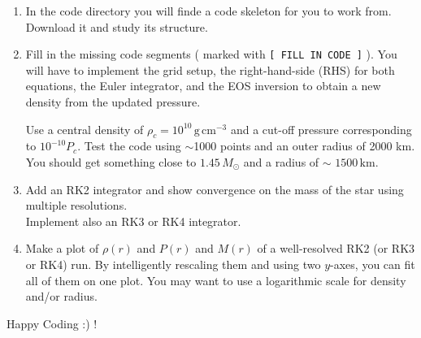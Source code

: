 \documentclass[11pt]{article}
\begin{document}


\begin{enumerate}
\item In the code directory  you will finde a code skeleton for you to work
  from. Download it and study its structure.

\item Fill in the missing code segments (
  marked with  {\tt [ FILL IN CODE ]} ). You will have to implement
  the grid setup, the right-hand-side (RHS) for both equations,
  the Euler integrator, and the EOS inversion to obtain a new density
  from the updated pressure.

  Use a central density of $\rho_c = 10^{10}\,
  \mathrm{g}\,\mathrm{cm}^{-3}$ and a cut-off pressure corresponding
  to  $10^{-10} P_c$.  Test the code using 
  $\sim$1000 points and an outer radius of 2000 km.  You should get
  something close to $1.45\,M_\odot$ and a radius of
  $\sim$ $1500\,\mathrm{km}$.

\item Add an RK2 integrator and show convergence on
  the mass of the star using multiple resolutions. \\

  Implement also an RK3 or RK4 integrator.

\item

  Make a plot of $\rho(r)$ and $P(r)$ and $M(r)$ of a well-resolved
  RK2 (or RK3 or RK4) run. By intelligently rescaling them and using two
  $y$-axes, you can fit all of them on one plot. You may want to use a
  logarithmic scale for density and/or radius.
  
\end{enumerate}

Happy Coding :) !
\end{document}
